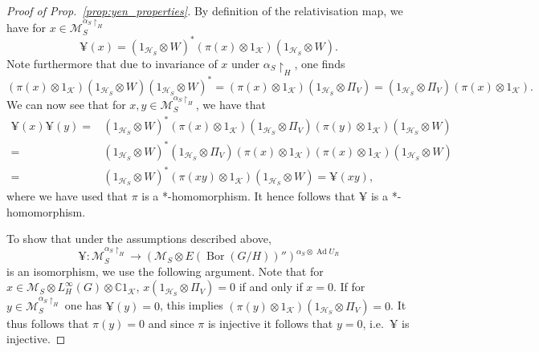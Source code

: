 \documentclass[sn-mathphys-num]{sn-jnl}%
\newcommand{\CC}{\mathbb{C}}
\newcommand{\HH}{\mathcal{H}}
\newcommand{\KK}{\mathcal{K}}
\newcommand{\MM}{\mathcal{M}}
\DeclareMathOperator{\Bor}{Bor}
\DeclareMathOperator{\Ad}{Ad}
\numberwithin{equation}{section}
\theoremstyle{thmstyleone}%
\theoremstyle{thmstyletwo}%
\theoremstyle{thmstylethree}%
\begin{document}
\begin{proof}[Proof of Prop.\ \ref{prop:yen_properties}]
        By definition of the relativisation map, we have for $x\in \MM_S^{\alpha_S\restriction_H}$
        \begin{equation}
            \yen(x)=(1_{\HH_S}\otimes W)^*(\pi(x)\otimes 1_{\KK})(1_{\HH_S}\otimes W).
        \end{equation}
        Note furthermore that due to invariance of $x$ under $\alpha_S\restriction_H$, one finds \begin{equation}
            (\pi(x)\otimes 1_\KK)(1_{\HH_S}\otimes W)(1_{\HH_S}\otimes W)^*=(\pi(x)\otimes 1_\KK)(1_{\HH_S}\otimes\Pi_V)=(1_{\HH_S}\otimes\Pi_V)(\pi(x)\otimes 1_\KK).
        \end{equation}
        We can now see that for $x,y\in \MM_S^{\alpha_S\restriction_H}$, we have that
        \begin{align}
            \yen(x)\yen(y)=&(1_{\HH_S}\otimes W)^*(\pi(x)\otimes 1_\KK)(1_{\HH_S}\otimes\Pi_V)(\pi(y)\otimes 1_\KK)(1_{\HH_S}\otimes W)\nonumber\\
            =&(1_{\HH_S}\otimes W)^*(1_{\HH_S}\otimes\Pi_V)(\pi(x)\otimes 1_\KK)(\pi(x)\otimes 1_\KK)(1_{\HH_S}\otimes W)\nonumber\\
            =&(1_{\HH_S}\otimes W)^*(\pi(xy)\otimes 1_\KK)(1_{\HH_S}\otimes W)=\yen(xy),
        \end{align}
        where we have used that $\pi$ is a *-homomorphism. It hence follows that $\yen$ is a *-homomorphism.
        
        To show that under the assumptions described above, \begin{equation}
            \yen:\MM_S^{\alpha_S\restriction_H}\to (\MM_S\otimes E(\Bor(G/H))'')^{\alpha_S\otimes \Ad U_R}
        \end{equation} is an isomorphism, we use the following argument. Note that for $x\in \MM_S \otimes L_H^\infty(G)\otimes \CC 1_\KK$, $x(1_{\HH_S}\otimes\Pi_V)=0$ if and only if $x=0$. If for $y\in \MM_S^{\alpha_S\restriction_H}$ one has $\yen(y)=0$, this implies $(\pi(y)\otimes 1_\KK)(1_{\HH_S}\otimes\Pi_V)=0$. It thus follows that $\pi(y)=0$ and since $\pi$ is injective it follows that $y=0$, i.e.~$\yen$ is injective.
        

\end{proof}
\end{document}
